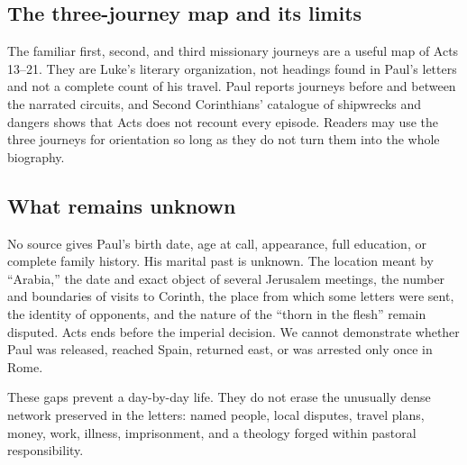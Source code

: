 \subsection{The three-journey map and its limits}

The familiar first, second, and third missionary journeys are a useful map of
Acts 13--21. They are Luke's literary organization, not headings found in
Paul's letters and not a complete count of his travel. Paul reports journeys
before and between the narrated circuits, and Second Corinthians' catalogue
of shipwrecks and dangers shows that Acts does not recount every episode.
Readers may use the three journeys for orientation so long as they do not turn
them into the whole biography.

\subsection{What remains unknown}

No source gives Paul's birth date, age at call, appearance, full education, or
complete family history. His marital past is unknown. The location meant by
``Arabia,'' the date and exact object of several Jerusalem meetings, the
number and boundaries of visits to Corinth, the place from which some letters
were sent, the identity of opponents, and the nature of the ``thorn in the
flesh'' remain disputed. Acts ends before the imperial decision. We cannot
demonstrate whether Paul was released, reached Spain, returned east, or was
arrested only once in Rome.

These gaps prevent a day-by-day life. They do not erase the unusually dense
network preserved in the letters: named people, local disputes, travel plans,
money, work, illness, imprisonment, and a theology forged within pastoral
responsibility.
